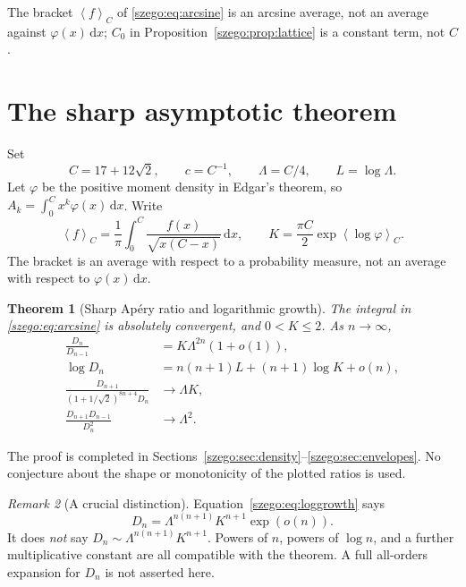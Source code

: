 \documentclass[11pt,a4paper]{article}
\numberwithin{equation}{section}
\newtheorem{theorem}{Theorem}[section]
\theoremstyle{remark}\newtheorem{remark}[theorem]{Remark}
\newcommand{\dd}{\,\mathrm d}
\newcommand{\Lam}{\Lambda}
\newcommand{\mean}[1]{\left\langle#1\right\rangle}
\begin{document}
\noindent The bracket $\mean{f}_C$ of \eqref{szego:eq:arcsine} is an arcsine
average, not an average against $\varphi(x)\dd x$; $C_0$ in
Proposition~\ref{szego:prop:lattice} is a constant term, not $C$.

\section{The sharp asymptotic theorem}
Set
\begin{equation}\label{szego:eq:constants}
 C=17+12\sqrt2,\qquad c=C^{-1},\qquad
 \Lam=C/4,\qquad L=\log\Lam.
\end{equation}
Let $\varphi$ be the positive moment density in Edgar's theorem, so
$A_k=\int_0^C x^k\varphi(x)\dd x$.
Write
\begin{equation}\label{szego:eq:arcsine}
 \mean{f}_C=\frac1\pi\int_0^C\frac{f(x)}{\sqrt{x(C-x)}}\dd x,
 \qquad K=\frac{\pi C}{2}\exp\mean{\log\varphi}_C.
\end{equation}
The bracket is an average with respect to a probability measure, not an
average with respect to $\varphi(x)\dd x$.

\begin{theorem}[Sharp Ap\'ery ratio and logarithmic growth]\label{szego:thm:main}
The integral in \eqref{szego:eq:arcsine} is absolutely convergent, and $0<K\leq2$.
As $n\to\infty$,
\begin{align}
 \frac{D_n}{D_{n-1}}&=K\Lam^{2n}(1+o(1)),\label{szego:eq:sharpnorm}\\
 \log D_n&=n(n+1)L+(n+1)\log K+o(n),\label{szego:eq:loggrowth}\\
 \frac{D_{n+1}}{(1+1/\sqrt2)^{8n+4}D_n}&\longrightarrow\Lam K,\label{szego:eq:oeisratio}\\
 \frac{D_{n+1}D_{n-1}}{D_n^2}&\longrightarrow\Lam^2.\label{szego:eq:curvature}
\end{align}
\end{theorem}
The proof is completed in Sections~\ref{szego:sec:density}--\ref{szego:sec:envelopes}.
No conjecture about the shape or monotonicity of the plotted ratios is used.

\begin{remark}[A crucial distinction]
Equation~\eqref{szego:eq:loggrowth} says
\[
 D_n=\Lam^{n(n+1)}K^{n+1}\exp(o(n)).
\]
It does \emph{not} say $D_n\sim\Lam^{n(n+1)}K^{n+1}$.
Powers of $n$, powers of $\log n$, and a further multiplicative constant
are all compatible with the theorem. A full all-orders expansion for
$D_n$ is not asserted here.
\end{remark}
\end{document}
